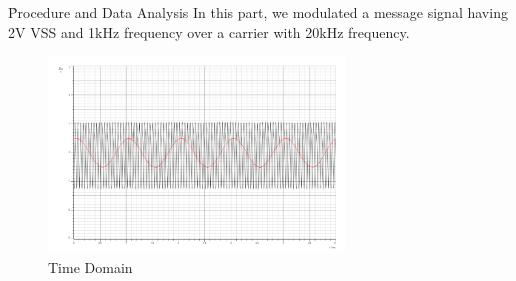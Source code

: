 \documentclass[12pt]{article}
\begin{document}
\clearpage
\h{Procedure and Data Analysis}
In this part, we modulated a message signal having 2V VSS and 1kHz frequency over a carrier with 20kHz frequency.
\begin{figure}[H]
    \centering
    \includegraphics[width=0.7\textwidth]{assets/time_domain.png}
    \caption{Time Domain}
\end{figure}
\end{document}
